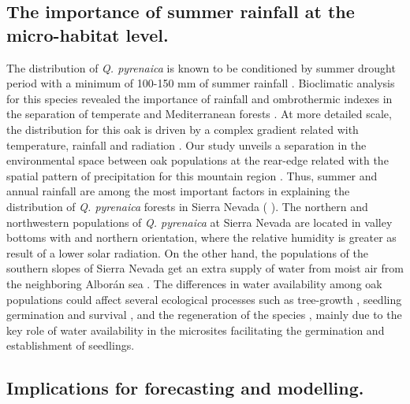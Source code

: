 \subsection{The importance of summer rainfall at the micro-habitat level.}\label{sec:multivarSummerRainfall}
The distribution of \emph{Q. pyrenaica} is known to be conditioned by summer drought period with a minimum of 100-150 mm of summer rainfall \autocite{BlancoCastroetal2005BosquesIbericos,GarciaJimenez20099230Robledales}. Bioclimatic analysis for this species revealed the importance of rainfall and ombrothermic indexes in the separation of temperate and Mediterranean forests \autocite{delRioetal2007BioclimaticAnalysis}. At more detailed scale, the distribution for this oak is driven by a complex gradient related with temperature, rainfall and radiation \autocite{Gavilanetal2007ModellingCurrent,Urbietaetal2011MediterraneanPine}. Our study unveils a separation in the environmental space between oak populations at the rear-edge related with the spatial pattern of precipitation for this mountain region \autocite{Pereiraetal2016SpatialInterpolation}. Thus, summer and annual rainfall are among the most important factors in explaining the distribution of \emph{Q. pyrenaica} forests in Sierra Nevada ( ). The northern and northwestern populations of \emph{Q. pyrenaica} at Sierra Nevada are located in valley bottoms with and northern orientation, where the relative humidity is greater as result of a lower solar radiation. On the other hand, the populations of the southern slopes of Sierra Nevada get an extra supply of water from moist air from the neighboring Alborán sea \autocite{MartinezParrasMoleroMesa1982EcologiaFitosociologia}. The differences in water availability among oak populations could affect several ecological processes such as tree-growth \autocite{GeaIzquierdoCanellas2014LocalClimate,PerezLuqueetal2020LanduseLegacies}, seedling germination and survival \autocite{Gomez2003ImpactVertebrate,GomezAparicioetal2008OakSeedling,Mendozaetal2009SeedingExperiment}, and the regeneration of the species \autocite{Gomezetal2001ProblemasRegeneracion}, mainly due to the key role of water availability in the microsites facilitating the germination and establishment of seedlings.

\subsection{Implications for forecasting and modelling.}\label{sec:multivar:ImplicaForecast}

